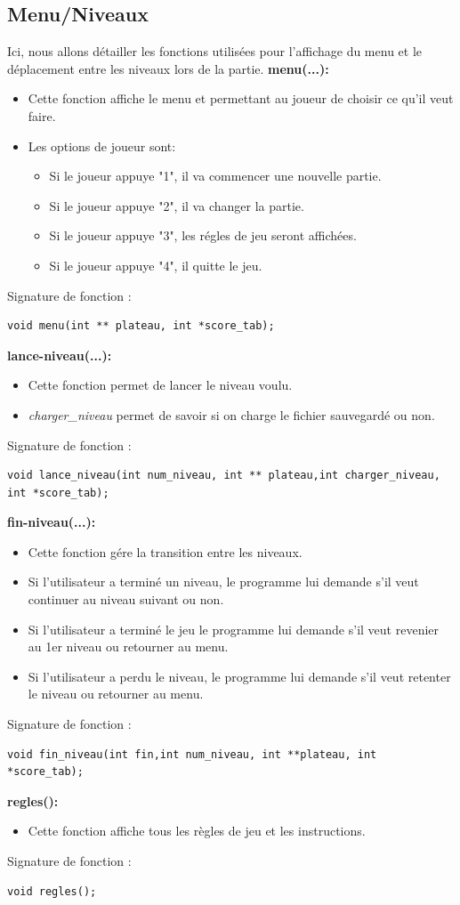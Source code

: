 \documentclass[12pt,french]{article}
\begin{document}
\subsection{Menu/Niveaux}
Ici, nous allons détailler les fonctions utilisées pour l'affichage du menu et le déplacement entre les niveaux lors de la partie.
\newline
\textbf{menu(...):}
\begin{itemize}
\item Cette fonction affiche le menu et permettant au joueur de choisir ce qu'il veut faire.
\item Les options de joueur sont: 
\begin{itemize}
\item Si le joueur appuye "1", il va commencer une nouvelle partie.
\item Si le joueur appuye "2", il va changer la partie.
\item Si le joueur appuye "3", les régles de jeu seront affichées.
\item Si le joueur appuye "4", il quitte le jeu.
\end{itemize}
\end{itemize}
Signature de fonction :
\begin{lstlisting}
void menu(int ** plateau, int *score_tab);
\end{lstlisting}
\textbf{lance-niveau(...):}
\begin{itemize}
\item Cette fonction permet de lancer le niveau voulu.
\item \textit{charger\_niveau} permet de savoir si on charge le fichier sauvegardé ou non.
\end{itemize}
Signature de fonction :
\begin{lstlisting}
void lance_niveau(int num_niveau, int ** plateau,int charger_niveau, int *score_tab);
\end{lstlisting}
\textbf{fin-niveau(...):}
\begin{itemize}
\item Cette fonction gére la transition entre les niveaux.
\item Si l'utilisateur a terminé un niveau, le programme lui demande s'il veut continuer au niveau suivant ou non.
\item Si l'utilisateur a terminé le jeu le programme lui demande s'il veut revenier au 1er niveau ou retourner au menu.
\item Si l'utilisateur a perdu le niveau, le programme lui demande s'il veut retenter le niveau ou retourner au menu.
\end{itemize}
Signature de fonction :
\begin{lstlisting}
void fin_niveau(int fin,int num_niveau, int **plateau, int *score_tab);
\end{lstlisting}
\textbf{regles():}
\begin{itemize}
\item Cette fonction affiche tous les règles de jeu et les instructions.
\end{itemize}
Signature de fonction :
\begin{lstlisting}
void regles();
\end{lstlisting}
\end{document}
